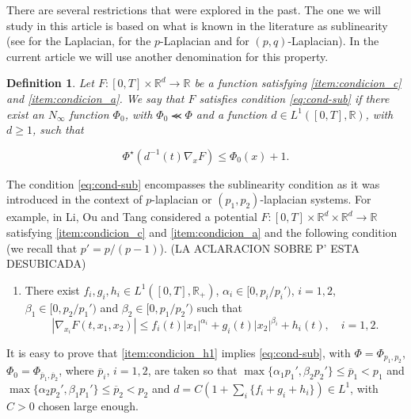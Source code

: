\documentclass[twoside]{article}
\makeatletter
\newtheorem{defi}[thm]{Definition}
\theoremstyle{remark}
\newcounter{example}[section]
\newcommand{\labitem}[2]{%
\def\@itemlabel{#1}
\item
\def\@currentlabel{#1}\label{#2}}
\newcommand{\rr}{\mathbb{R}}
\renewcommand{\leq}{\leqslant}
\renewcommand{\geq}{\geqslant}
\makeatother
\begin{document}
There are several restrictions that were explored in the past. The one we will study in this article is based on what is known in the literature as sublinearity (see \cite{tang1998periodic,wu1999periodic,zhao2004periodic} for the Laplacian, \cite{tang2010periodic,li2015infinitely} for the $p$-Laplacian and \cite{yang2013existence,li2014periodic,pasca2010periodic,pacsca2010some} for $(p,q)$-Laplacian). In the current article we will use another denomination for this property.




\begin{defi} Let $F:[0,T]\times \rr^d\to\rr$ be a function satisfying \ref{item:condicion_c} and \ref{item:condicion_a}. We say that $F$ satisfies condition \eqref{eq:cond-sub} if there exist an $N_{\infty}$ function $\Phi_0$, with $\Phi_0 \llcurly \Phi$ and
a function $d \in  L^1([0,T],\rr)$, with $d\geq 1$, such that

\begin{equation}\label{eq:cond-sub}
  \Phi^{\star}(d^{-1}(t)\nabla_x F)\leq \Phi_0(x)+1.\tag{$B$}
\end{equation}
\end{defi}


The condition \eqref{eq:cond-sub} encompasses the sublinearity condition as it was introduced in the context of $p$-laplacian or $(p_1,p_2)$-laplacian systems. For example, in
 \cite[Thm. 1.1.]{li2014periodic} Li, Ou and Tang considered a potential $F:[0,T]\times\rr^d\times\rr^d\to\rr$ satisfying \ref{item:condicion_c} and \ref {item:condicion_a} and the following condition  (we recall that $p'=p/(p-1)$). (LA ACLARACION SOBRE P' ESTA DESUBICADA)
\begin{enumerate}   
  \labitem{(H)}{item:condicion_h1} There exist $f_i,g_i,h_i\in L^1([0,T],\rr_+)$,  $\alpha_i\in [0,p_i/p_i')$, $i=1,2$,  $\beta_1\in [0,p_2/p_1')$ and $\beta_2\in [0,p_1/p_2')$ such that
 \begin{equation*}
    |\nabla_{x_i}F(t,x_1,x_2)|\leq f_i(t)|x_1|^{\alpha_i}+g_i(t)|x_2|^{\beta_i}+h_i(t),\quad i=1,2.
 \end{equation*}
\end{enumerate}
It is easy to prove that \ref{item:condicion_h1} implies \eqref{eq:cond-sub}, with $\Phi=\Phi_{p_1,p_2}$, 
$\Phi_0=\Phi_{\overline{p}_1,\overline{p}_2}$, where $\overline{p}_i$, $i=1,2$, are taken so that  $\max\{\alpha_1p_1',\beta_2p_2'\}\leq \overline{p}_1<p_1$ and $\max\{\alpha_2p_2',\beta_1p_1'\}\leq \overline{p}_2<p_2$ and  $d=C(1+\sum_i \{f_i+g_i+h_i\})\in L^1$, with  $C>0$ chosen large enough.
\end{document}
